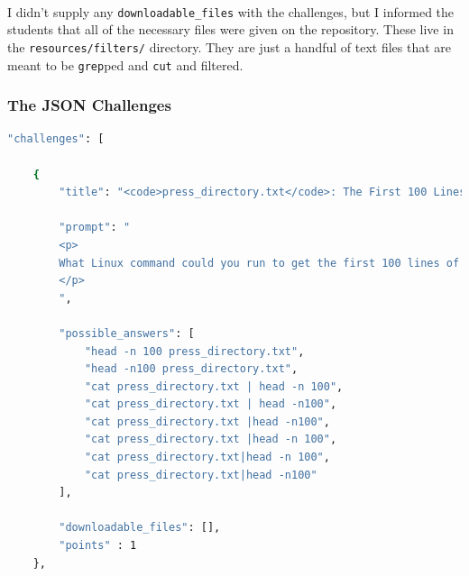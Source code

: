 \documentclass[11pt]{article}
\begin{document}
	\paragraph{} I didn't supply any \texttt{downloadable\_files} with the challenges, but I informed the students that all of the necessary files were given on the repository. These live in the \texttt{resources/filters/} directory. They are just a handful of text files that are meant to be \texttt{grep}ped and \texttt{cut} and filtered.

	\begin{center}
		\graphicspath{ {.} }
		\centering
	\end{center}

	\hrulefill

	\newpage

	\subsubsection{The JSON Challenges}

	\begin{lstlisting}[language=bash]
"challenges": [

	{ 
		"title": "<code>press_directory.txt</code>: The First 100 Lines",

		"prompt": "
		<p> 
		What Linux command could you run to get the first 100 lines of the <code>press_directory.txt</code> file? 
		</p>
		",

		"possible_answers": [ 
			"head -n 100 press_directory.txt",
			"head -n100 press_directory.txt",
			"cat press_directory.txt | head -n 100",
			"cat press_directory.txt | head -n100",
			"cat press_directory.txt |head -n100",
			"cat press_directory.txt |head -n 100",
			"cat press_directory.txt|head -n 100",
			"cat press_directory.txt|head -n100"
		],
		
		"downloadable_files": [],
		"points" : 1
	},
\end{lstlisting}	
\end{document}
